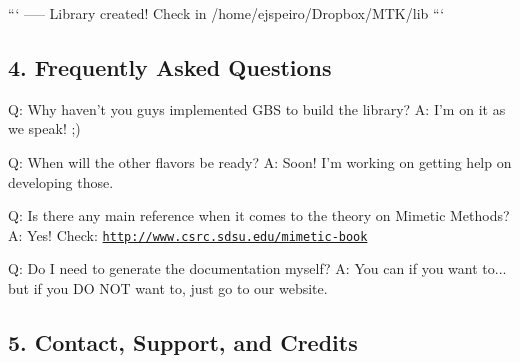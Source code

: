 \begin{DoxyPre}```
----- Library created! Check in /home/ejspeiro/Dropbox/MTK/lib
```


\end{DoxyPre}



\begin{DoxyPre}\subsection*{4. Frequently Asked Questions}\end{DoxyPre}



\begin{DoxyPre}\end{DoxyPre}



\begin{DoxyPre}Q: Why haven't you guys implemented GBS to build the library?
A: I'm on it as we speak! ;)\end{DoxyPre}



\begin{DoxyPre}Q: When will the other flavors be ready?
A: Soon! I'm working on getting help on developing those.\end{DoxyPre}



\begin{DoxyPre}Q: Is there any main reference when it comes to the theory on Mimetic Methods?
A: Yes! Check: \href{http://www.csrc.sdsu.edu/mimetic-book}{\tt http://www.csrc.sdsu.edu/mimetic-book}\end{DoxyPre}



\begin{DoxyPre}Q: Do I need to generate the documentation myself?
A: You can if you want to... but if you DO NOT want to, just go to our website.


\end{DoxyPre}



\begin{DoxyPre}\subsection*{5. Contact, Support, and Credits}\end{DoxyPre}



